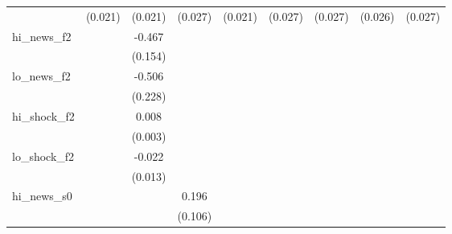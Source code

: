 {\begin{tabular}{l*{8}{c}}
            &     (0.021)         &     (0.021)         &     (0.027)         &     (0.021)         &     (0.027)         &     (0.027)         &     (0.026)         &     (0.027)         \\
\addlinespace
hi\_news\_f2  &                     &      -0.467\sym{***}&                     &                     &                     &                     &                     &                     \\
            &                     &     (0.154)         &                     &                     &                     &                     &                     &                     \\
\addlinespace
lo\_news\_f2  &                     &      -0.506\sym{**} &                     &                     &                     &                     &                     &                     \\
            &                     &     (0.228)         &                     &                     &                     &                     &                     &                     \\
\addlinespace
hi\_shock\_f2 &                     &       0.008\sym{***}&                     &                     &                     &                     &                     &                     \\
            &                     &     (0.003)         &                     &                     &                     &                     &                     &                     \\
\addlinespace
lo\_shock\_f2 &                     &      -0.022\sym{*}  &                     &                     &                     &                     &                     &                     \\
            &                     &     (0.013)         &                     &                     &                     &                     &                     &                     \\
\addlinespace
hi\_news\_s0  &                     &                     &       0.196\sym{*}  &                     &                     &                     &                     &                     \\
            &                     &                     &     (0.106)         &                     &                     &                     &                     &                     \\

\end{tabular}}
